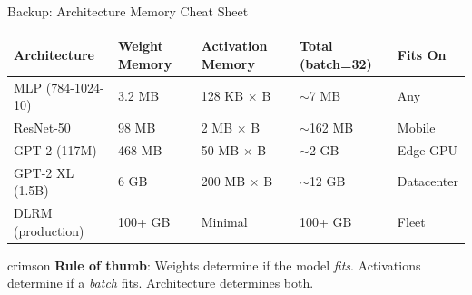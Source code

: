 \documentclass[aspectratio=169, 12pt]{beamer}
\begin{document}
\begin{frame}{Backup: Architecture Memory Cheat Sheet}
\scriptsize
\renewcommand{\arraystretch}{1.05}
\begin{tabular}{@{}lllll@{}}
  \toprule
  \textbf{Architecture} & \textbf{Weight Memory} & \textbf{Activation Memory} & \textbf{Total (batch=32)} & \textbf{Fits On} \\
  \midrule
  MLP (784-1024-10) & 3.2 MB & 128 KB $\times$ B & $\sim$7 MB & Any \\
  ResNet-50 & 98 MB & 2 MB $\times$ B & $\sim$162 MB & Mobile \\
  GPT-2 (117M) & 468 MB & 50 MB $\times$ B & $\sim$2 GB & Edge GPU \\
  GPT-2 XL (1.5B) & 6 GB & 200 MB $\times$ B & $\sim$12 GB & Datacenter \\
  DLRM (production) & 100+ GB & Minimal & 100+ GB & Fleet \\
  \bottomrule
\end{tabular}

\vspace{0.1cm}
\begin{mlsyscard}{crimson}
{\scriptsize \textbf{Rule of thumb}: Weights determine if the model \emph{fits}. Activations determine if a \emph{batch} fits. Architecture determines both.}
\end{mlsyscard}
\end{frame}
\end{document}
